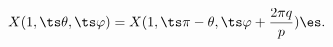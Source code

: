 \begin{equation}
X (1,\ts \theta,\ts \varphi) = X(1,\ts \pi - \theta,\ts 
\varphi + \frac{2 \pi q}{p}) \es. 
\label{eq:bndrCndtn}
\end{equation}


